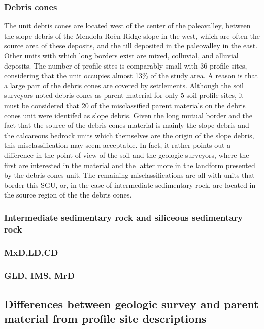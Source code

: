 \documentclass[preprint,12pt,authoryear]{elsarticle}
\begin{document}
\subsubsection{Debris cones}
The unit debris cones are located west of the center of the paleavalley, between the slope debris of the Mendola-Ro\`en-Ridge slope in the west, which are often the source area of these deposits, and the till deposited in the paleovalley in the east. Other units with which long borders exist are mixed, colluvial, and alluvial deposits. The number of profile sites is comparably small with 36 profile sites, considering that the unit occupies almost 13\% of the study area. A reason is that a large part of the debris cones are covered by settlements.  Although the soil surveyors noted debris cones as parent material for only 5 soil profile sites, it must be considered that 20 of the misclassified parent materials on the debris cones unit were identifed as slope debris. Given the long mutual border and the fact that the source of the debris cones material is mainly the slope debris and the calcareous bedrock units which themselves are the origin of the slope debris, this misclassification may seem acceptable. In fact, it rather points out a difference in the point of view of the soil and the geologic surveyors, where the first are interested in the material and the latter more in the landform presented by the debris cones unit. The remaining misclassifications are all with units that border this SGU, or, in the case of intermediate sedimentary rock, are located in the source region of the the debris cones.
\subsubsection{Intermediate sedimentary rock and siliceous sedimentary rock}
\subsubsection{MxD,LD,CD}
\subsubsection{GLD, IMS, MrD}

\subsection{Differences between geologic survey and parent material from profile site descriptions} 
\end{document}
